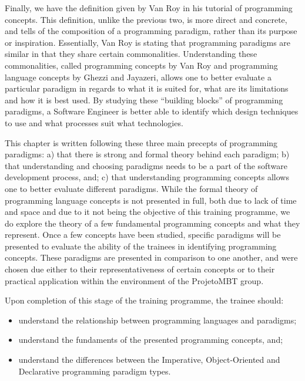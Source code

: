 Finally, we have the definition given by Van Roy in his tutorial of programming concepts. This definition, unlike the previous two, is more direct and concrete, and tells of the composition of a programming paradigm, rather than its purpose or inspiration. Essentially, Van Roy is stating that programming paradigms are similar in that they share certain commonalities. Understanding these commonalities, called programming concepts by Van Roy and programming language concepts by Ghezzi and Jayazeri, allows one to better evaluate a particular paradigm in regards to what it is suited for, what are its limitations and how it is best used. By studying these ``building blocks'' of programming paradigms, a Software Engineer is better able to identify which design techniques to use and what processes suit what technologies.

This chapter is written following these three main precepts of programming paradigms: a) that there is strong and formal theory behind each paradigm; b) that understanding and choosing paradigms needs to be a part of the software development process, and; c) that understanding programming concepts allows one to better evaluate different paradigms. While the formal theory of programming language concepts is not presented in full, both due to lack of time and space and due to it not being the objective of this training programme, we do explore the theory of a few fundamental programming concepts and what they represent. Once a few concepts have been studied, specific paradigms will be presented to evaluate the ability of the trainees in identifying programming concepts. These paradigms are presented in comparison to one another, and were chosen due either to their representativeness of certain concepts or to their practical application within the environment of the ProjetoMBT group.

Upon completion of this stage of the training programme, the trainee should:

\begin{itemize}
  \item understand the relationship between programming languages and paradigms;
  \item understand the fundaments of the presented programming concepts, and;
  \item understand the differences between the Imperative, Object-Oriented and Declarative programming paradigm types.
\end{itemize}


